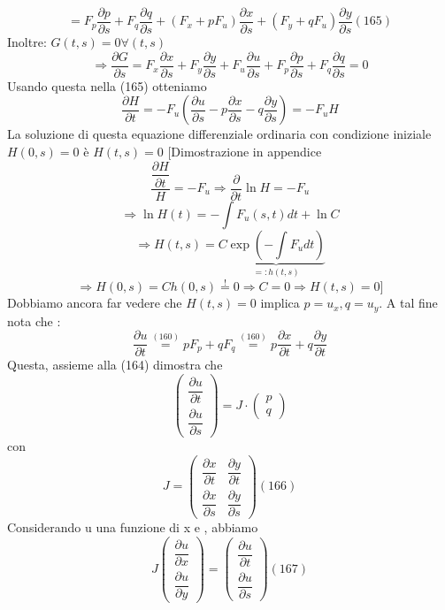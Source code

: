 \documentclass[a4paper,11pt]{report}
\begin{document}
\begin{equation}
=F_p \dfrac{\partial p}{\partial s} + F_q \dfrac{\partial q}{\partial s} + (F_x + pF_u)\dfrac{\partial x}{\partial s} + (F_y + qF_u)\dfrac{\partial y}{\partial s} (165)
\end{equation}
Inoltre: $G(t,s)=0 \forall (t,s)$
$$
\Rightarrow \dfrac{\partial G}{\partial s }=F_x \dfrac{\partial x}{\partial s} + F_y \dfrac{\partial y}{\partial s} + F_u \dfrac{\partial u}{\partial s} + F_p\dfrac{\partial p}{\partial s} + F_q \dfrac{\partial q}{ \partial s}=0
$$
Usando questa nella (165) otteniamo
$$
\dfrac{\partial H}{\partial t} = - F_u\left(\dfrac{\partial u}{\partial s} - p\dfrac{\partial x}{\partial s} - q\dfrac{\partial y}{\partial s}\right)=-F_u H
$$
La soluzione di questa equazione differenziale ordinaria con condizione iniziale $H(0,s)=0$ è $H(t,s)=0$
[Dimostrazione in appendice
$$
\dfrac{\dfrac{\partial H}{\partial t}}{H}=-F_u \Rightarrow \dfrac{\partial}{\partial t}\ln H = -F_u
$$
$$
\Rightarrow \ln H(t) = -\int F_u(s,t)dt + \ln C
$$
$$
\Rightarrow H(t,s)=C\underset{=:h(t,s)}{\underbrace{\exp (-\int F_u dt)}}
$$
$$
\Rightarrow H(0,s)= C h(0,s) \overset{!}{=}0 \Rightarrow C=0 \Rightarrow H(t,s)=0]
$$
Dobbiamo ancora far vedere che $H(t,s)=0$ implica $p=u_x, q=u_y$. A tal fine nota che :
$$
\dfrac{\partial u}{\partial t}\overset{(160)}{=} p F_p + q F_q \overset{(160)}{=} p\dfrac{\partial x}{\partial t} + q \dfrac{\partial y}{\partial t}
$$
Questa, assieme alla (164) dimostra che 
$$
\left(\begin{matrix}
\dfrac{\partial u}{\partial t}\\
\dfrac{\partial u}{\partial s}
\end{matrix}\right) = J \cdot \left(\begin{matrix}
p\\
q
\end{matrix}\right)
$$
con
\begin{equation}
J=\left(\begin{matrix}
\dfrac{\partial x}{\partial t} & \dfrac{\partial y}{\partial t} \\
\dfrac{\partial x}{\partial s} & \dfrac{\partial y}{\partial s}
\end{matrix}\right) (166)
\end{equation}
Considerando u una funzione di x e , abbiamo 
\begin{equation}
J\left(\begin{matrix}
\dfrac{\partial u}{\partial x} \\
\dfrac{\partial u}{\partial y}
\end{matrix}\right)=\left(\begin{matrix}
\dfrac{\partial u}{\partial t} \\
\dfrac{\partial u}{\partial s}
\end{matrix}\right) (167)
\end{equation}
\end{document}
